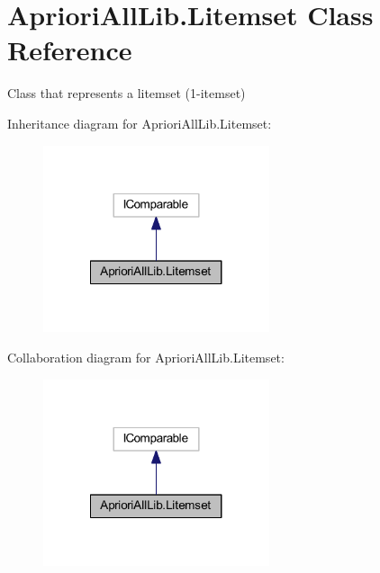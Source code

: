 \hypertarget{class_apriori_all_lib_1_1_litemset}{\section{Apriori\-All\-Lib.\-Litemset Class Reference}
\label{class_apriori_all_lib_1_1_litemset}
}


Class that represents a litemset (1-\/itemset)  




Inheritance diagram for Apriori\-All\-Lib.\-Litemset\-:\nopagebreak
\begin{figure}[H]
\begin{center}
\leavevmode
\includegraphics[width=188pt]{class_apriori_all_lib_1_1_litemset__inherit__graph}
\end{center}
\end{figure}


Collaboration diagram for Apriori\-All\-Lib.\-Litemset\-:\nopagebreak
\begin{figure}[H]
\begin{center}
\leavevmode
\includegraphics[width=188pt]{class_apriori_all_lib_1_1_litemset__coll__graph}
\end{center}
\end{figure}
